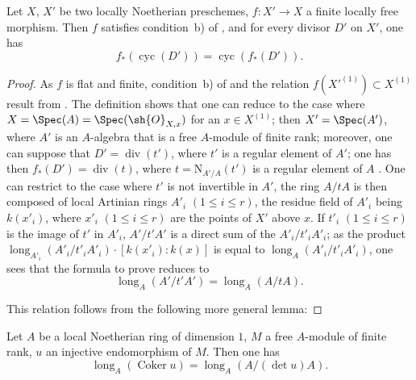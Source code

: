 \begin{proposition}[21.10.17]
\label{IV.21.10.17}
Let $X$, $X'$ be two locally Noetherian preschemes, $f:X'\to X$ a finite locally free morphism.
Then $f$ satisfies condition~b) of , and for every divisor $D'$ on $X'$, one has
\[
\label{IV.21.10.17.1}
  f_*(\operatorname{cyc}(D'))=\operatorname{cyc}(f_*(D')).
  \tag{21.10.17.1}
\]
\end{proposition}

\begin{proof}
As $f$ is flat and finite, condition~b) of  and the relation $f(X'^{(1)})\subset X^{(1)}$ result from .
The definition  shows that one can reduce to the case where $X=\Spec(A)=\Spec(\sh{O}_{X,x})$ for an $x\in X^{(1)}$;
then $X'=\Spec(A')$, where $A'$ is an $A$-algebra that is a free $A$-module of finite rank;
moreover, one can suppose that $D'=\operatorname{div}(t')$, where $t'$ is a regular element of $A'$;
one has then $f_*(D')=\operatorname{div}(t)$, where $t=\mathrm{N}_{A'/A}(t')$ is a regular element of $A$ .
One can restrict to the case where $t'$ is not invertible in $A'$, the ring $A/tA$ is then composed of local Artinian rings $A'_i$ $(1\leq i\leq r)$, the residue field of $A'_i$ being $k(x'_i)$, where $x'_i$ $(1\leq i\leq r)$ are the points of $X'$ above $x$.
If $t'_i$ $(1\leq i\leq r)$ is the image of $t'$ in $A'_i$, $A'/t'A'$ is a direct sum of the $A'_i/t'_iA'_i$;
as the product $\operatorname{long}_{A'_i}(A'_i/t'_iA'_i)\cdot[k(x'_i):k(x)]$ is equal to $\operatorname{long}_A(A'_i/t'_iA'_i)$, one sees that the formula to prove reduces to
\[
\label{IV.21.10.17.2}
  \operatorname{long}_A(A'/t'A')=\operatorname{long}_A(A/tA).
  \tag{21.10.17.2}
\]


This relation follows from the following more general lemma:
\end{proof}

\begin{lemma}[21.10.17.3]
\label{IV.21.10.17.3}
Let $A$ be a local Noetherian ring of dimension $1$, $M$ a free $A$-module of finite rank, $u$ an injective endomorphism of $M$. Then one has
\[
\label{IV.21.10.17.4}
  \operatorname{long}_A(\operatorname{Coker} u)=\operatorname{long}_A(A/(\det u)A).
  \tag{21.10.17.4}
\]
\end{lemma}

